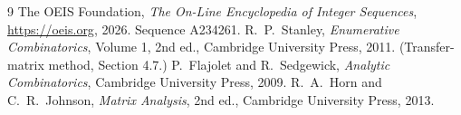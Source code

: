 \documentclass[11pt,a4paper]{article}
\theoremstyle{plain}
\theoremstyle{definition}
\begin{document}
\begin{thebibliography}{9}
 The OEIS Foundation, \emph{The On-Line Encyclopedia of Integer
Sequences}, \url{https://oeis.org}, 2026. Sequence A234261.
 R.~P.~Stanley, \emph{Enumerative Combinatorics}, Volume 1, 2nd ed.,
Cambridge University Press, 2011. (Transfer-matrix method, Section 4.7.)
 P.~Flajolet and R.~Sedgewick, \emph{Analytic Combinatorics}, Cambridge
University Press, 2009.
 R.~A.~Horn and C.~R.~Johnson, \emph{Matrix Analysis}, 2nd ed., Cambridge
University Press, 2013.
\end{thebibliography}
\end{document}
